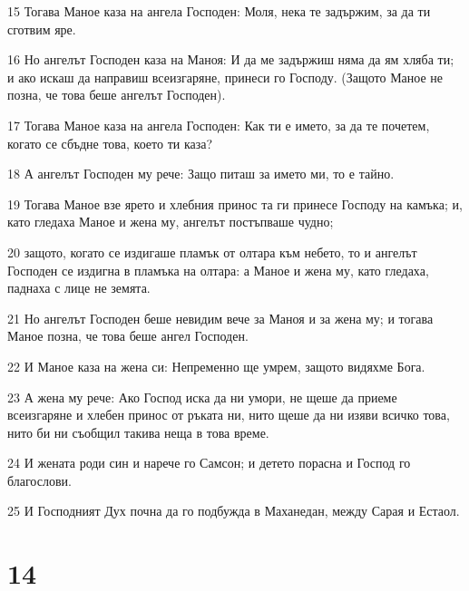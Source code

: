 \par 15 Тогава Маное каза на ангела Господен: Моля, нека те задържим, за да ти сготвим яре.
\par 16 Но ангелът Господен каза на Маноя: И да ме задържиш няма да ям хляба ти; и ако искаш да направиш всеизгаряне, принеси го Господу. (Защото Маное не позна, че това беше ангелът Господен).
\par 17 Тогава Маное каза на ангела Господен: Как ти е името, за да те почетем, когато се сбъдне това, което ти каза?
\par 18 А ангелът Господен му рече: Защо питаш за името ми, то е тайно.
\par 19 Тогава Маное взе ярето и хлебния принос та ги принесе Господу на камъка; и, като гледаха Маное и жена му, ангелът постъпваше чудно;
\par 20 защото, когато се издигаше пламък от олтара към небето, то и ангелът Господен се издигна в пламъка на олтара: а Маное и жена му, като гледаха, паднаха с лице не земята.
\par 21 Но ангелът Господен беше невидим вече за Маноя и за жена му; и тогава Маное позна, че това беше ангел Господен.
\par 22 И Маное каза на жена си: Непременно ще умрем, защото видяхме Бога.
\par 23 А жена му рече: Ако Господ иска да ни умори, не щеше да приеме всеизгаряне и хлебен принос от ръката ни, нито щеше да ни изяви всичко това, нито би ни съобщил такива неща в това време.
\par 24 И жената роди син и нарече го Самсон; и детето порасна и Господ го благослови.
\par 25 И Господният Дух почна да го подбужда в Маханедан, между Сарая и Естаол.

\chapter{14}

